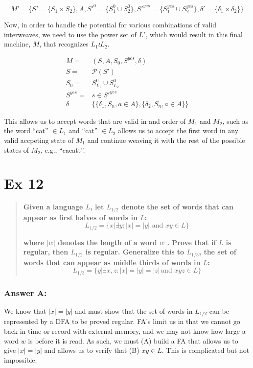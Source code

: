 \documentclass[titlepage]{article}\usepackage[]{graphicx}\usepackage[]{color}
\begin{document}
\[ 
	M' = \{ S' = \{ S_{1} \times S_{2} \} , A, S'^0 = \{ S_{1}^0 \cup  S_{2}^0
\}, S'^{yes} = \{ S_{1}^{yes} \cup S_{2}^{yes} \} , \delta' = \{ \delta_{1}
\times \delta_{2} \} \}
\]


Now, in order to handle the potential for various combinations of valid
interweaves, we need to use the power set of $L'$, which would result in this
final machine, $M$, that  recognizes $L_1 \wr L_2$.

\begin{align*}
	M =& (S, A, S_0, S^{yes}, \delta) \\
	S =& \mathcal{P}(S')  \\
	S_0 =& S_{L_1}^0 \cup S_{L_2}^0 \\
	S^{yes} =& s \in S'^{yes} \\ 
	\delta =& \{ \{\delta_1, S_n, a \in A \}, \{ \delta_2, S_n, a \in A \} \} 
\end{align*}

This allows us to accept words that are valid in and order of $M_1$  and $M_2$,
such as the word ``cat'' $\in L_1$ and ``cat'' $\in L_2$ allows us to accept
the first word in any valid accpeting state of $M_1$ and continue weaving it
with the rest of the possible states of $M_2$, e.g., ``cacatt''. 


\section*{Ex 12}
\begin{quote}
	\textbf{Given a language $L$, let $L_{1/2}$ denote the set of words that can appear
    as first halves of words in $L$:}
    \[ L_{1/2} = \{ x | \exists y : |x| = |y| \text{ and } x y \in L \} \]
    
  \textbf{where $|w |$ denotes the length of a word $w$ . Prove that if $L$ is
      regular, then $L_{1/2}$ is regular. Generalize this to $L_{1/3}$, the set of
      words that can appear as middle thirds of words in $L$:}
  \[ L_{1/3} = \{ y | \exists x,z : |x| = |y| = |z|\,  \text{and } x y z \in L \} \]
  
\end{quote}
\subsubsection*{Answer A:}
We know that $|x| = |y|$ and must show that the set of words in $L_{1/2}$ can
be represented by a DFA to be proved regular. FA's limit us in that we cannot
go back in time or record with external memory, and we may not know how large a
word $w$ is before it is read. As such, we must (A) build a FA that allows us to
give $|x| = |y|$ and allows us to verify that (B) $xy \in L$. This is complicated
but not impossible.
\end{document}

